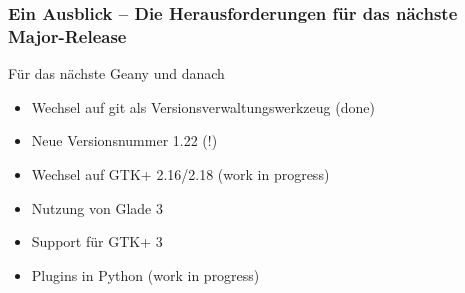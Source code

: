 \begin{frame}
	\frametitle{Ein Ausblick -- Die Herausforderungen für das nächste Major-Release}
	\begin{block}{Für das nächste Geany und danach}
		\begin{itemize}
			\item Wechsel auf git als Versionsverwaltungswerkzeug (done)
			\item Neue Versionsnummer 1.22 (!)
			\item Wechsel auf GTK+ 2.16/2.18 (work in progress)
			\item Nutzung von Glade 3
			\item Support für GTK+ 3
			\item Plugins in Python (work in progress)
		\end{itemize}
	\end{block}
	\vspace{2ex}
\end{frame}
